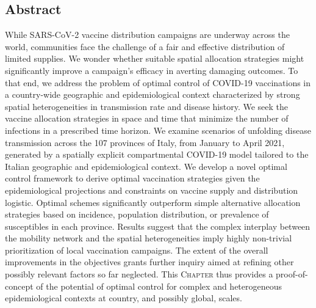 \begin{fullwidth}
\section{Abstract}
While SARS-CoV-2 vaccine distribution campaigns are underway across the world, communities face the challenge of a fair and effective distribution of limited supplies. We wonder whether suitable spatial allocation strategies might significantly improve a campaign's efficacy in averting damaging outcomes. To that end, we address the problem of optimal control of COVID-19 vaccinations in a country-wide geographic and epidemiological context characterized by strong spatial heterogeneities in transmission rate and disease history. We seek the vaccine allocation strategies in space and time that minimize the number of infections in a prescribed time horizon. We examine scenarios of unfolding disease transmission across the 107 provinces of Italy, from January to April 2021, generated by a spatially explicit compartmental COVID-19 model tailored to the Italian geographic and epidemiological context. We develop a novel optimal control framework to derive optimal vaccination strategies given the epidemiological projections and constraints on vaccine supply and distribution logistic. Optimal schemes significantly outperform simple alternative allocation strategies based on incidence, population distribution, or prevalence of susceptibles in each province. Results suggest that the complex interplay between the mobility network and the spatial heterogeneities imply highly non-trivial prioritization of local vaccination campaigns. The extent of the overall improvements in the objectives grants further inquiry aimed at refining other possibly relevant factors so far neglected. This \textsc{Chapter} thus provides a proof-of-concept of the potential of optimal control for complex and heterogeneous epidemiological contexts at country, and possibly global, scales.
\end{fullwidth}


